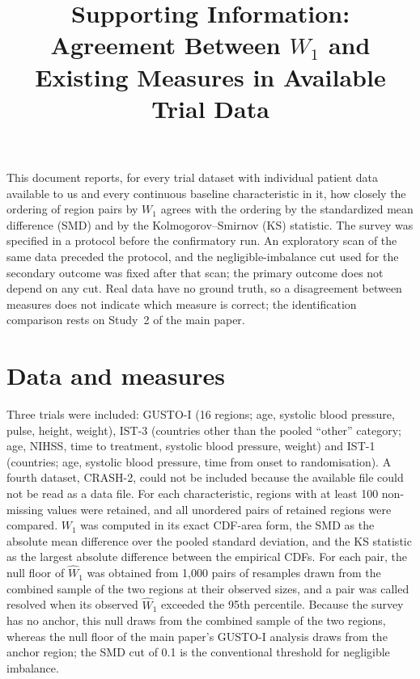 \documentclass[11pt]{article}
\title{Supporting Information: Agreement Between $W_1$ and Existing Measures in Available Trial Data}
\date{}
\begin{document}
\maketitle

This document reports, for every trial dataset with individual patient data available to us and every continuous baseline characteristic in it, how closely the ordering of region pairs by $W_1$ agrees with the ordering by the standardized mean difference (SMD) and by the Kolmogorov--Smirnov (KS) statistic. The survey was specified in a protocol before the confirmatory run. An exploratory scan of the same data preceded the protocol, and the negligible-imbalance cut used for the secondary outcome was fixed after that scan; the primary outcome does not depend on any cut. Real data have no ground truth, so a disagreement between measures does not indicate which measure is correct; the identification comparison rests on Study~2 of the main paper.

\section{Data and measures}

Three trials were included: GUSTO-I (16 regions; age, systolic blood pressure, pulse, height, weight), IST-3 (countries other than the pooled ``other'' category; age, NIHSS, time to treatment, systolic blood pressure, weight) and IST-1 (countries; age, systolic blood pressure, time from onset to randomisation). A fourth dataset, CRASH-2, could not be included because the available file could not be read as a data file. For each characteristic, regions with at least 100 non-missing values were retained, and all unordered pairs of retained regions were compared. $W_1$ was computed in its exact CDF-area form, the SMD as the absolute mean difference over the pooled standard deviation,\cite{austin2011} and the KS statistic as the largest absolute difference between the empirical CDFs. For each pair, the null floor of $\widehat{W}_1$ was obtained from 1,000 pairs of resamples drawn from the combined sample of the two regions at their observed sizes, and a pair was called resolved when its observed $\widehat{W}_1$ exceeded the 95th percentile. Because the survey has no anchor, this null draws from the combined sample of the two regions, whereas the null floor of the main paper's GUSTO-I analysis draws from the anchor region; the SMD cut of 0.1 is the conventional threshold for negligible imbalance.\cite{austin2009}
\end{document}
